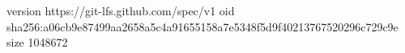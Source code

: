 version https://git-lfs.github.com/spec/v1
oid sha256:a06cb9e87499aa2658a5c4a91655158a7e5348f5d9f40213767520296c729c9e
size 1048672
